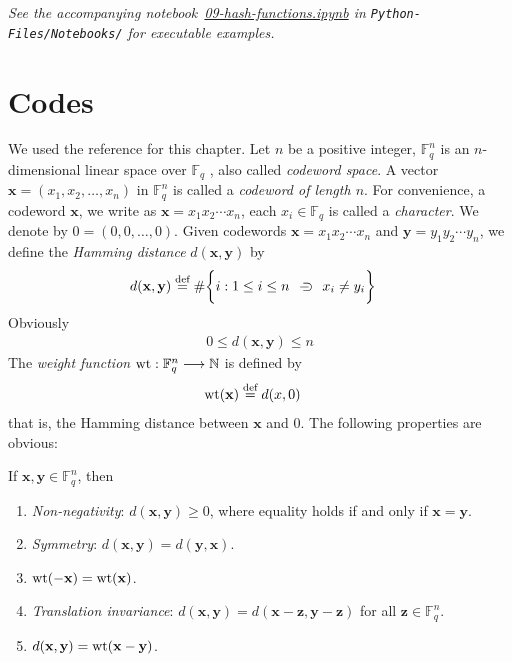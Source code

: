 \documentclass[a4paper, 12pt]{book} %
\newcommand{\notebook}[1]{\begingroup\small\itshape
    See the accompanying notebook~\href{run:./Python-Files/Notebooks/#1}{#1} in \texttt{Python-Files/Notebooks/} for executable examples.%
\endgroup}
\begin{document}
\notebook{09-hash-functions.ipynb}

\chapter{Codes}
\label{ch:codes}

We used the reference \cite{zheng2022modern} for this chapter. Let $n$ be a positive integer, $\mathbb{F}_q^n$ is an $n$-dimensional linear space over $\mathbb{F}_q$ , also called \emph{codeword space}. A vector $\mathbf{x} = (x_1, x_2, \ldots , x_n)$ in $\mathbb{F}_q^n$ is called a \emph{codeword of length $n$}. For convenience, a codeword $\mathbf{x}$, we write as $\mathbf{x} = x_1x_2\cdots x_n$, each $x_i \in \mathbb{F}_q$ is called a \emph{character}. We denote by $0 = (0,0, \ldots, 0)$.
Given codewords $\mathbf{x} = x_1 x_2 \cdots x_n$ and $\mathbf{y} = y_1 y_2 \cdots y_n$, we define the \emph{Hamming distance} $d(\mathbf{x}, \mathbf{y})$ by 
\begin{align}
    d(\mathbf{x}, \mathbf{y}) &\overset{\text{def}}{=} \# \bigg\{ i: 1 \leq i \leq n~\hspace{2mm}{\supset}\kern-1em{-} \hspace{2mm}~x_i \neq y_i\bigg\}
\end{align}
Obviously
\begin{align}
    0 \leq d(\mathbf{x}, \mathbf{y}) \leq n
\end{align}
The \emph{weight function} $\mathrm{wt}: \mathbb{F}_q^n \longrightarrow \mathbb{N}$ is defined by 
\begin{align}
    \mathrm{wt}(\mathbf{x}) &\overset{\text{def}}{=} d(x, 0)
\end{align}
that is, the Hamming distance between $\mathbf{x}$ and $0$. The following properties are obvious:

\begin{proposition}
    If $\mathbf{x}, \mathbf{y} \in \mathbb{F}_q^n$, then 
    \begin{enumerate}
        \item \emph{Non-negativity}: $d(\mathbf{x}, \mathbf{y}) \geq 0$, where equality holds if and only if $\mathbf{x} = \mathbf{y}$.
        \item \emph{Symmetry}: $d(\mathbf{x}, \mathbf{y}) = d(\mathbf{y}, \mathbf{x})$.
        \item $\mathrm{wt}(-\mathbf{x}) = \mathrm{wt}(\mathbf{x})$.
        \item \emph{Translation invariance}: $d(\mathbf{x}, \mathbf{y}) = d(\mathbf{x} - \mathbf{z}, \mathbf{y} - \mathbf{z})$ for all $\mathbf{z} \in \mathbb{F}_q^n$.
        \item $d(\mathbf{x}, \mathbf{y}) = \mathrm{wt}(\mathbf{x} - \mathbf{y})$.
    \end{enumerate}
\end{proposition}
\end{document}

